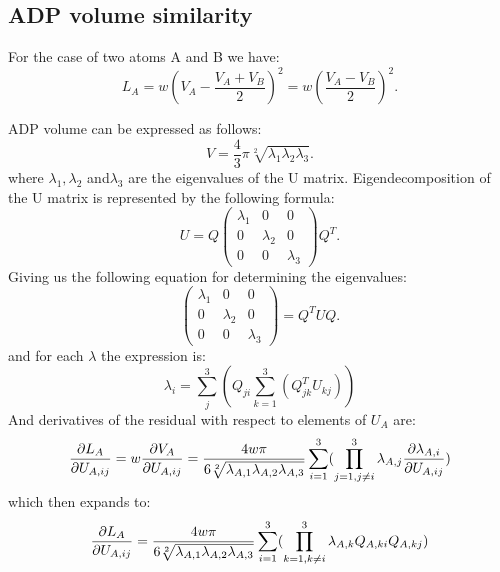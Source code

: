 \documentclass[pdf]{iucr}
\begin{document}
\subsection{ADP volume similarity}
For the case of two atoms A and B we have:
\begin{equation}
L_{A} = w  \left(V_{A}-\frac{V_{A}+V_{B}}{2}\right)^2 = w \left( \frac{V_{A}-V_{B}}{2}\right) ^2.
\end{equation}

ADP volume can be expressed as follows:
\begin{equation}
V = \frac{4}{3}\pi \sqrt[2]{\lambda_{1}\lambda_{2}\lambda_{3}}.
\end{equation}
where $\lambda_{1}, \lambda_{2}$ and$ \lambda_{3}$ are the eigenvalues of the U matrix. Eigendecomposition of the U matrix is represented by the following formula:
\begin{equation}
U = Q\begin{pmatrix}\lambda_{1}&0&0\\0&\lambda_{2}&0\\0&0&\lambda_{3}\end{pmatrix} Q^{T}.
\end{equation}
Giving us the following equation for determining the eigenvalues:
\begin{equation}
\begin{pmatrix}\lambda_{1}&0&0\\0&\lambda_{2}&0\\0&0&\lambda_{3}\end{pmatrix} = Q^{T}UQ.
\end{equation}
and for each $\lambda$ the expression is:
\begin{equation}
\lambda_{i} = \sum_{j}^3\left(Q_{ji}\sum_{k=1}^3(Q^{T}_{jk}U_{kj})\right)
\end{equation}
And derivatives of the residual with respect to elements of $U_{A}$ are:
\begin{equation}
\frac{\partial L_{A}}{\partial U_{A,ij}} = w \frac{\partial V_{A}}{\partial U_{A,ij}} = \frac{4w\pi}{6\sqrt[2]{\lambda_{A,1}\lambda_{A,2}\lambda_{A,3}}} \sum_{i=1}^3(\prod_{j=1, j \neq i}^3\lambda_{A,j}\frac{\partial \lambda_{A,i}}{\partial U_{A,ij}})
\end{equation}
which then expands to:
\begin{equation}
\frac{\partial L_{A}}{\partial U_{A,ij}} = \frac{4w\pi}{6\sqrt[2]{\lambda_{A,1}\lambda_{A,2}\lambda_{A,3}}} \sum_{i=1}^3(\prod_{k=1, k \neq i}^3\lambda_{A,k}Q_{A,ki}Q_{A,kj})
\end{equation}
\end{document}
